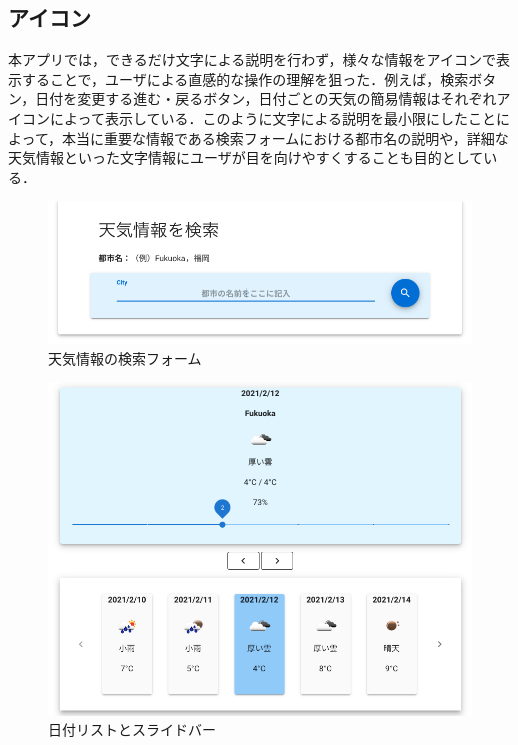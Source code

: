 \subsection{アイコン}
本アプリでは，できるだけ文字による説明を行わず，様々な情報をアイコンで表示することで，ユーザによる直感的な操作の理解を狙った．例えば，検索ボタン，日付を変更する進む・戻るボタン，日付ごとの天気の簡易情報はそれぞれアイコンによって表示している．このように文字による説明を最小限にしたことによって，本当に重要な情報である検索フォームにおける都市名の説明や，詳細な天気情報といった文字情報にユーザが目を向けやすくすることも目的としている．


\begin{figure}[htbp]
\centering
\includegraphics[width=15cm]{top1.png}
\caption{天気情報の検索フォーム}
\label{fig:top}
\end{figure}

\begin{figure}[htbp]
\centering
\includegraphics[width=15cm]{main2.png}
\caption{日付リストとスライドバー}
\label{fig:main}
\end{figure}


